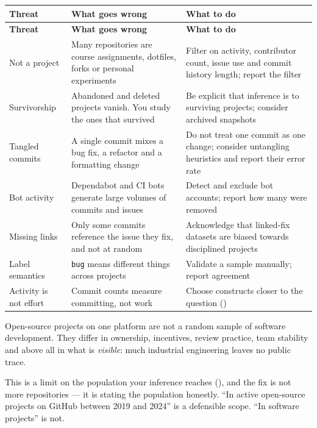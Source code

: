 \begin{center}
\small
\begin{longtable}{@{}L{3.0cm}L{5.2cm}L{6.0cm}@{}}
\toprule
\textbf{Threat} & \textbf{What goes wrong} & \textbf{What to do} \\
\midrule
\endfirsthead
\toprule
\textbf{Threat} & \textbf{What goes wrong} & \textbf{What to do} \\
\midrule
\endhead
\bottomrule
\endfoot
Not a project
  & Many repositories are course assignments, dotfiles, forks or personal
    experiments
  & Filter on activity, contributor count, issue use and commit history length;
    report the filter \\
Survivorship
  & Abandoned and deleted projects vanish. You study the ones that survived
  & Be explicit that inference is to surviving projects; consider archived
    snapshots \\
Tangled commits
  & A single commit mixes a bug fix, a refactor and a formatting change
  & Do not treat one commit as one change; consider untangling heuristics and
    report their error rate \\
Bot activity
  & Dependabot and CI bots generate large volumes of commits and issues
  & Detect and exclude bot accounts; report how many were removed \\
Missing links
  & Only some commits reference the issue they fix, and not at random
  & Acknowledge that linked-fix datasets are biased towards disciplined
    projects \\
Label semantics
  & \texttt{bug} means different things across projects
  & Validate a sample manually; report agreement \\
Activity is not effort
  & Commit counts measure committing, not work
  & Choose constructs closer to the question () \\
\end{longtable}
\end{center}

\begin{pitfall}
Open-source projects on one platform are not a random sample of software
development. They differ in ownership, incentives, review practice, team
stability and above all in what is \emph{visible}: much industrial engineering
leaves no public trace.

\medskip
This is a limit on the population your inference reaches
(), and the fix is not more repositories --- it is stating the
population honestly. ``In active open-source projects on GitHub between 2019
and 2024'' is a defensible scope. ``In software projects'' is not.
\end{pitfall}

